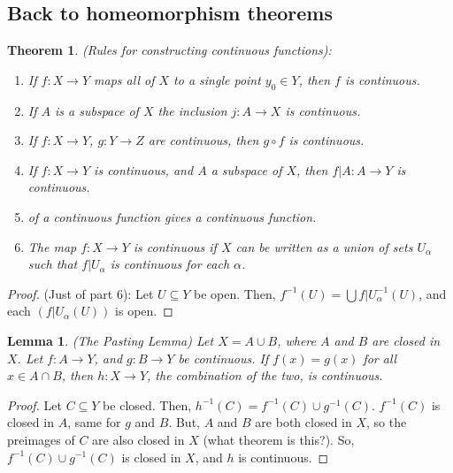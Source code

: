 \documentclass[11pt]{article}
\newtheorem{theorem}{Theorem}[section]
\newtheorem{lemma}{Lemma}[section]
\begin{document}
\subsection{Back to homeomorphism theorems}
\label{sec:orgcfb2a64}
\begin{theorem}
(Rules for constructing continuous functions): 

\begin{enumerate}
\item{} If \(f:X\rightarrow Y\) maps all of \(X\) to a
single point \(y_0\in Y\), then \(f\) is continuous.
\item\relax [Inclusion] If \(A\) is a subspace of \(X\) the inclusion \(j:
   A\rightarrow X\) is continuous.
\item\relax [Composites] If \(f:X\rightarrow Y\), \(g:Y\rightarrow Z\) are
continuous, then \(g\circ f\) is continuous.
\item{} If \(f:X\rightarrow Y\) is continuous, and \(A\) a
subspace of \(X\), then \(f|A:A\rightarrow Y\) is continuous.
\item{} of a continuous function
gives a continuous function.
\item{} The map \(f:X\rightarrow Y\) is
continuous if \(X\) can be written as a union of sets \(U_{\alpha}\)
such that \(f|U_{\alpha}\) is continuous for each \(\alpha\).
\end{enumerate}
\end{theorem}

\begin{proof}
(Just of part 6): Let \(U\subseteq Y\) be open. Then, \(f^{-1}(U) =
\bigcup f|U_{\alpha}^{-1}(U)\), and each \((f|U_{\alpha}(U))\) is open. 
\end{proof}

\begin{lemma}
(The Pasting Lemma) Let \(X = A\cup B\), where \(A\) and \(B\) are closed in
\(X\). Let \(f:A\rightarrow Y\), and \(g:B\rightarrow Y\) be continuous. If
\(f(x) = g(x)\) for all \(x \in A\cap B\), then \(h: X\rightarrow Y\), the
combination of the two, is continuous.
\end{lemma}

\begin{proof}
Let \(C \subseteq Y\) be closed. Then, \(h^{-1}(C) = f^{-1}(C)\cup
g^{-1}(C)\). \(f^{-1}(C)\) is closed in \(A\), same for \(g\) and \(B\). But,
\(A\) and \(B\) are both closed in \(X\), so the preimages of \(C\) are also
closed in \(X\) (what theorem is this?). So, \(f^{-1}(C)\cup g^{-1}(C)\)
is closed in \(X\), and \(h\) is continuous. 
\end{proof}
\end{document}
